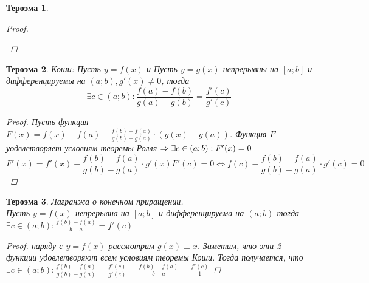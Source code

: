 \documentclass[oneside]{book}
\newtheorem{thm}{Тероэма}[chapter] %
\begin{document}
\begin{enumerate}
\begin{itemize}
\begin{thm}
\begin{proof}
\begin{center}
          \end{center}
  \end{proof}
\end{thm}
\begin{thm}
  Коши: Пусть $y = f(x)$ и Пусть $y = g(x)$ непрерывны на $[a; b]$ и дифференцируемы на $(a;b), g'(x) \neq 0$, тогда $$
    \exists c \in (a;b): \frac{f(a) - f(b)}{g(a) - g(b)} = \frac{f'(c)}{g'(c)}
  $$
  \begin{proof}
    Пусть функция $F(x) = f(x) - f(a) - \frac{f(b) - f(a)}{g(b) - g(a)} \cdot (g(x) - g(a))$.
    Функция $F$ уодвлетворяет условиям теоремы Ролля $\Rightarrow \\ \exists c \in (a; b): F'(x) = 0$
    $$
      F'(x) = f'(x) - \frac{f(b)-f(a)}{g(b) - g(a)} \cdot g'(x)

      F'(c) = 0 \Leftrightarrow f(c) - \frac{f(b)-f(a)}{g(b) - g(a)} \cdot g'(c) = 0
    $$
  \end{proof}
\end{thm}
\begin{thm}
  Лагранжа о конечном приращении. \\ Пусть $y = f(x)$ непрерывна на $[a;b]$ и дифференцируема на $(a;b)$ тогда
  $\exists c \in (a;b) : \frac{f(b) - f(a)}{b - a} = f'(c)$
  \begin{proof}
    наряду с $y = f(x)$ рассмотрим $g(x) \equiv x$. Заметим, что эти 2 функции удовлетворяют всем условиям теоремы Коши. Тогда получается,
    что $\exists c \in (a;b) : \frac{f(b) - f(a)}{g(b) - g(a)} = \frac{f'(c)}{g'(c)} = \frac{f(b) - f(a)}{b - a} = \frac{f'(c)}{1}$
  \end{proof}
\end{thm}
\begin{center}
\end{center}
\end{itemize}
\end{enumerate}
\end{document}
